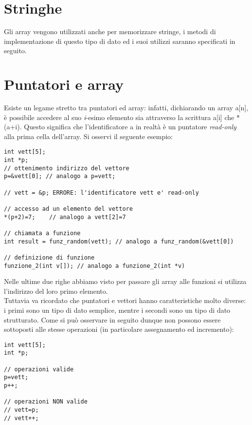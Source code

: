 \section{Stringhe}
Gli array vengono utilizzati anche per memorizzare stringe, i metodi di implementazione di questo tipo di dato ed i suoi utilizzi saranno specificati in seguito.

\section{Puntatori e array}
Esiste un legame stretto tra puntatori ed array: infatti, dichiarando un array \colorbox{light-gray}{a[n]}, è possibile accedere al suo \textit{i}-esimo elemento sia attraverso la scrittura \colorbox{light-gray}{a[i]} che \colorbox{light-gray}{*(a+i)}. Questo significa che l'identificatore \colorbox{light-gray}{a} in realtà è un puntatore \textit{read-only} alla prima cella dell'array. Si osservi il seguente esempio:
\begin{lstlisting}[title={Utilizzo di puntatori come array}]
int vett[5];
int *p;
// ottenimento indirizzo del vettore
p=&vett[0]; // analogo a p=vett;

// vett = &p; ERRORE: l'identificatore vett e' read-only

// accesso ad un elemento del vettore
*(p+2)=7;    // analogo a vett[2]=7

// chiamata a funzione
int result = funz_random(vett); // analogo a funz_random(&vett[0])

// definizione di funzione
funzione_2(int v[]); // analogo a funzione_2(int *v)
\end{lstlisting}

Nelle ultime due righe abbiamo visto per passare gli array alle funzioni si utilizza l'indirizzo del loro primo elemento.\\
Tuttavia va ricordato che puntatori e vettori hanno caratteristiche molto diverse: i primi sono un tipo di dato semplice, mentre i secondi sono un tipo di dato strutturato. Come si può osservare in seguito dunque non possono essere sottoposti alle stesse operazioni (in particolare assegnamento ed incremento):
\begin{lstlisting}[title={Differenze puntatori/array}]
int vett[5];
int *p;

// operazioni valide
p=vett;
p++;

// operazioni NON valide
// vett=p;
// vett++;
\end{lstlisting}

